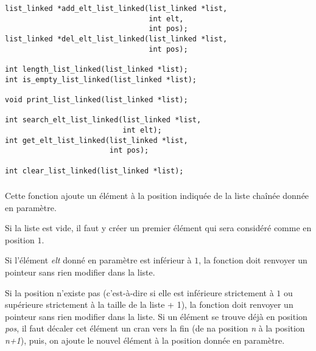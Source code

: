 \lstset{language=C}
\begin{lstlisting}[frame=single]
list_linked *add_elt_list_linked(list_linked *list,
                                 int elt,
                                 int pos);
list_linked *del_elt_list_linked(list_linked *list,
                                 int pos);

int length_list_linked(list_linked *list);
int is_empty_list_linked(list_linked *list);

void print_list_linked(list_linked *list);

int search_elt_list_linked(list_linked *list,
                           int elt);
int get_elt_list_linked(list_linked *list,
                        int pos);

int clear_list_linked(list_linked *list);
\end{lstlisting}


\clearpage


\subsubsection*{}

\noindent Cette fonction ajoute un élément à la position indiquée de la liste chaînée donnée en paramètre.

\smallskip

\noindent Si la liste est vide, il faut y créer un premier élément qui sera considéré comme en position $ 1 $.

\noindent Si l'élément \textit{elt} donné en paramètre est inférieur à $ 1 $, la fonction doit renvoyer un pointeur  sans rien modifier dans la liste.

\noindent Si la position n'existe pas (c'est-à-dire si elle est inférieure strictement à $ 1 $ ou supérieure strictement à la taille de la liste + 1), la fonction doit renvoyer un pointeur  sans rien modifier dans la liste.
Si un élément se trouve déjà en position \textit{pos}, il faut décaler cet élément un cran vers la fin (de na position \textit{n} à la position \textit{n+1}), puis, on ajoute le nouvel élément à la position donnée en paramètre.

